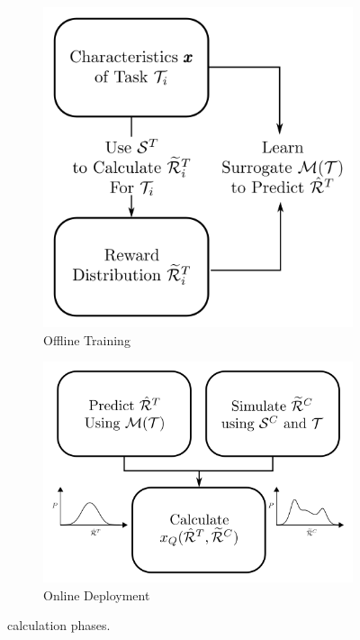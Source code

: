 \begin{figure}[tbp]
    \centering
    \begin{subfigure}[b]{0.50\linewidth}
        \centering
        \includegraphics[width=0.65\linewidth]{Figures/xQ_train.png}
        \vfill
        \caption{Offline Training}
        \label{fig:xQ_train}
    \end{subfigure}%
    \hfill
    \begin{subfigure}[b]{0.50\linewidth}
        \centering
        \includegraphics[width=0.65\linewidth]{Figures/xQ_test.png}
        \vspace{0.5cm}
        \caption{Online Deployment}
        \label{fig:sQ_test}
    \end{subfigure} 
    \caption{\xQ{} calculation phases.}
    \label{fig:xQ_test_train}
    \vspace{-0.5cm}
\end{figure}

